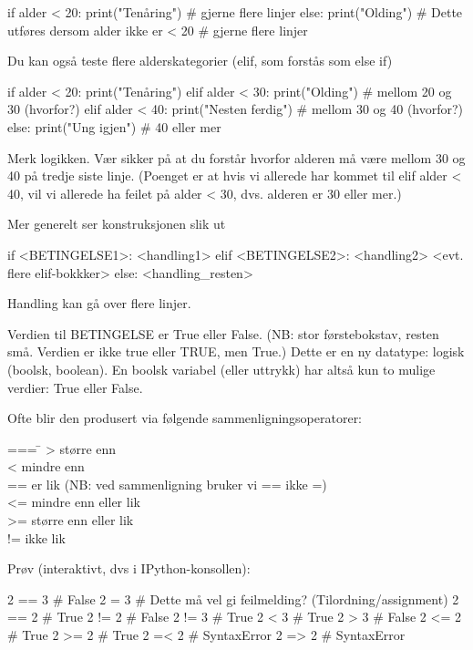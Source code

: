 \begin{usncodebox}
if alder < 20: 
   print("Tenåring")
   # gjerne flere linjer
else: 
   print("Olding")     # Dette utføres dersom alder ikke er < 20
   # gjerne flere linjer
\end{usncodebox}

Du kan også teste flere alderskategorier (elif, som forstås som else if) 

\begin{usncodebox}
if alder < 20: 
   print("Tenåring")
elif alder < 30:           
   print("Olding")         # mellom 20 og 30 (hvorfor?) 
elif alder < 40: 
   print("Nesten ferdig")  # mellom 30 og 40 (hvorfor?)
else: 
   print("Ung igjen")  # 40 eller mer 
\end{usncodebox}

Merk logikken. Vær sikker på at du forstår hvorfor alderen må være mellom 30 og 40 på tredje siste linje. (Poenget er at hvis vi allerede har kommet til elif alder < 40, vil vi allerede ha feilet på alder < 30, dvs. alderen er 30 eller mer.) 

Mer generelt ser konstruksjonen slik ut

\begin{usncodebox}
if <BETINGELSE1>: 
   <handling1>
elif <BETINGELSE2>: 
   <handling2>
<evt. flere elif-bokkker>
else: 
   <handling_resten>
\end{usncodebox}

Handling kan gå over flere linjer. 

Verdien til BETINGELSE er True eller False. (NB: stor førstebokstav, resten små. Verdien er ikke true eller TRUE, men True.) Dette er en ny datatype: logisk (boolsk, boolean). En boolsk variabel (eller uttrykk) har altså kun to mulige verdier: True eller False. 

Ofte blir den produsert via følgende sammenligningsoperatorer:
\begin{tabbing}
=== \=\kill
>  \> større enn\\
<  \> mindre enn\\
== \> er lik  (NB: ved sammenligning bruker vi == ikke =)\\
<= \> mindre enn eller lik\\
>= \> større enn eller lik\\
!= \> ikke lik
\end{tabbing}

Prøv (interaktivt, dvs i IPython-konsollen):
\begin{usncodebox}
2 == 3   # False
2 = 3    # Dette må vel gi feilmelding? (Tilordning/assignment)
2 == 2   # True
2 != 2   # False
2 != 3   # True
2 < 3    # True
2 > 3    # False
2 <= 2   # True
2 >= 2   # True
2 =< 2   # SyntaxError
2 => 2   # SyntaxError
\end{usncodebox}

